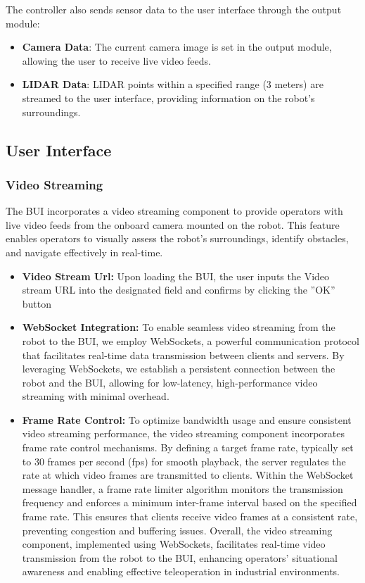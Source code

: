 \documentclass{article}
\begin{document}
The controller also sends sensor data to the user interface through the output module:
\begin{itemize}
    \item \textbf{Camera Data}: The current camera image is set in the output module, allowing the user to receive live video feeds.
    \item \textbf{LIDAR Data}: LIDAR points within a specified range (3 meters) are streamed to the user interface, providing information on the robot's surroundings.
\end{itemize}

\subsection{User Interface}
    \subsubsection{Video Streaming}
    The BUI incorporates a video streaming component to provide operators with live video feeds from the onboard camera mounted on the robot. This feature enables operators to visually assess the robot's surroundings, identify obstacles, and navigate effectively in real-time.
    
    \begin{itemize}
        \item \textbf{Video Stream Url:}
        Upon loading the BUI, the user inputs the Video stream URL into the designated field and confirms by clicking the ”OK” button
        \item \textbf{WebSocket Integration:}
        To enable seamless video streaming from the robot to the BUI, we employ WebSockets, a powerful communication protocol that facilitates real-time data transmission between clients and servers. By leveraging WebSockets, we establish a persistent connection between the robot and the BUI, allowing for low-latency, high-performance video streaming with minimal overhead.
    
        \item \textbf{Frame Rate Control:}
        To optimize bandwidth usage and ensure consistent video streaming performance, the video streaming component incorporates frame rate control mechanisms. By defining a target frame rate, typically set to 30 frames per second (fps) for smooth playback, the server regulates the rate at which video frames are transmitted to clients.
        Within the WebSocket message handler, a frame rate limiter algorithm monitors the transmission frequency and enforces a minimum inter-frame interval based on the specified frame rate. This ensures that clients receive video frames at a consistent rate, preventing congestion and buffering issues.
        Overall, the video streaming component, implemented using WebSockets, facilitates real-time video transmission from the robot to the BUI, enhancing operators' situational awareness and enabling effective teleoperation in industrial environments.
    \end{itemize}
    
\end{document}
